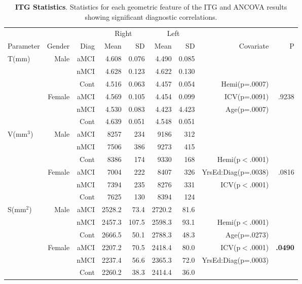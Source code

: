 \documentclass[12pt]{article}
\newcommand\T{\rule{0pt}{2.6ex}}
\newcommand\B{\rule[-1.2ex]{0pt}{0pt}}
\begin{document}
\newpage
\begin{sidewaystable}[h]
	\centering
	\footnotesize
	\begin{tabular}{l|rr|rrrr|rr}
	\hline
	& & & \multicolumn{2}{c}{Right} \T & \multicolumn{2}{c|}{Left} & & \\
	\multicolumn{1}{l|}{Parameter} \T\B & Gender & Diag & Mean & SD & Mean & SD & Covariate & P \\
	\hline\hline
	\multirow{6}{*}{T(mm)} & \multirow{3}{*}{Male} & aMCI\T & 4.608 & 0.076 & 4.490 & 0.085 & & \\
							&						& nMCI & 4.628 & 0.123 & 4.622 & 0.130 & & \\
							&						& Cont & 4.516 & 0.063 & 4.457 & 0.054 & Hemi(p=.0007) & \\\cline{2-7}	
							&	\multirow{3}{*}{Female}	& aMCI\T & 4.569 & 0.105 & 4.454 & 0.099 & ICV(p=.0091) & .9238 \\
							&						& nMCI & 4.530 & 0.083 & 4.423 & 4.423 & Age(p=.0007) & \\
							&						& Cont & 4.639 & 0.051 & 4.548 & 0.051 & & \\
	\hline
	\multirow{6}{*}{V(mm$^3$)} & \multirow{3}{*}{Male} & aMCI\T & 8257 & 234 & 9186 & 312 & &  \\
							&						& nMCI & 7506 & 386 & 9273 & 415 & & \\
							&						& Cont & 8386 & 174 & 9330 & 168 & Hemi(p$<$.0001) & \\\cline{2-7}
							&	\multirow{3}{*}{Female}	& aMCI\T & 7004 & 222 & 8407 & 326 & YrsEd:Diag(p=.0038) & .0816 \\
							&						& nMCI & 7394 & 235 & 8276 & 331 & ICV(p$<$.0001) & \\
							&						& Cont & 7625 & 130 & 8394 & 124 & & \\

	\hline
	\multirow{6}{*}{S(mm$^2$)} & \multirow{3}{*}{Male} & aMCI\T & 2528.2 & 73.4 & 2720.2 & 81.6 & & \\
							&						& nMCI & 2457.3 & 107.5 & 2598.3 & 93.1 & Hemi(p$<$.0001) & \\
							&						& Cont & 2666.5 & 50.1 & 2788.3 & 48.3 & Age(p=.0273) & \\\cline{2-7}
							&	\multirow{3}{*}{Female}	& aMCI\T & 2207.2 & 70.5 & 2418.4 & 80.0 & ICV(p$<$.0001)& \textbf{.0490}\\
							&						& nMCI & 2237.4 & 56.6 & 2365.3 & 72.0 & YrsEd:Diag(p=.0003)&\\
							&						& Cont & 2260.2 & 38.3 & 2414.4 & 36.0 & & \\
	\end{tabular}
	\caption{\textbf{ITG Statistics}.  Statistics for each geometric feature of the ITG and ANCOVA results showing significant diagnostic correlations.}
	\label{Wave1.ITG.ANCOVA}
\end{sidewaystable}
\end{document}
